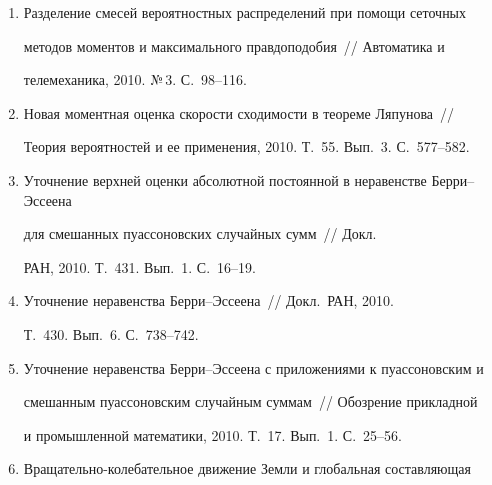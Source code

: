 \begin{enumerate}[1.]
информатизации~/\!\!/  Наукоемкие технологии, 2010. №\,1. С.~4--24.








\item {}


Разделение смесей вероятностных распределений при помощи сеточных 


методов моментов и максимального правдоподобия~/\!\!/ Автоматика и 


телемеханика, 2010. №\,3. С.~98--116.





\item {}


Новая моментная оценка скорости сходимости в теореме Ляпунова~/\!\!/  


Теория вероятностей и ее применения, 2010. Т.~55. Вып.~3. С.~577--582.





\item {}


Уточнение верхней оценки абсолютной постоянной в неравенстве Берри--Эс\-се\-ена 


для смешанных пуассоновских случайных сумм~/\!\!/  Докл. 


РАН, 2010. Т.~431. Вып.~1. С.~16--19.


\item {}


Уточнение неравенства Берри--Эссеена~/\!\!/  Докл.\ РАН, 2010. 


Т.~430. Вып.~6. С.~738--742.


\item {}


Уточнение неравенства Берри--Эссеена с приложениями к пуассоновским и 


смешанным пуассоновским случайным суммам~/\!\!/  Обозрение прикладной 


и промышленной математики, 2010. Т.~17. Вып.~1. С.~25--56.


\item {}


Вра\-ща\-тель\-но-колебательное движение Земли и глобальная составляющая 



\end{enumerate}
